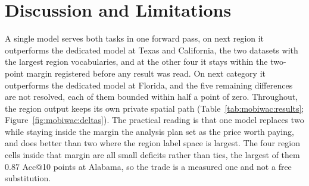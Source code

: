 %
%
\section{Discussion and Limitations}
\label{sec:mobiwac:discussion}

A single model serves both tasks in one forward pass, on next region it outperforms the dedicated
model at Texas and California, the two datasets with the largest region vocabularies, and at the
other four it stays within the two-point margin registered before any result was read. On next
category it outperforms the dedicated model at Florida, and the five remaining differences are not
resolved, each of them bounded within half a point of zero. Throughout, the region output keeps its
own private spatial path (Table~\ref{tab:mobiwac:results}; Figure~\ref{fig:mobiwac:deltas}). The
practical reading is that one model replaces two while staying inside the margin the analysis plan
set as the price worth paying, and does better than two where the region label space is largest.
The four region cells inside that margin are all small deficits rather than ties, the largest of
them $0.87$ Acc@10 points at Alabama, so the trade is a measured one and not a free substitution.

